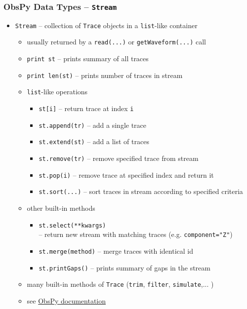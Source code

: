 \documentclass[t,10pt,compress=false,usepdftitle=false]{beamer}
\begin{document}
\begin{frame}[fragile]
    \frametitle{ObsPy Data Types -- \tt{Stream}}
    \begin{itemize}
    \item \verb#Stream# -- collection of \verb#Trace# objects in a \verb#list#-like container
        \begin{itemize}
        \item usually returned by a \verb#read(...)# or \verb#getWaveform(...)# call
        \item \verb#print st# -- prints summary of all traces
        \item \verb#print len(st)# -- prints number of traces in stream
        \item \verb#list#-like operations
            \begin{itemize}
            \item \verb#st[i]# -- return trace at index \verb#i#
            \item \verb#st.append(tr)# -- add a single trace
            \item \verb#st.extend(st)# -- add a list of traces
            \item \verb#st.remove(tr)# -- remove specified trace from stream
            \item \verb#st.pop(i)# -- remove trace at specified index and return it
            \item \verb#st.sort(...)# -- sort traces in stream according to specified criteria
            \end{itemize}
        \item other built-in methods
            \begin{itemize}
            \item \verb#st.select(**kwargs)#\\ -- return new stream with matching traces (e.g. \verb#component="Z"#)
            \item \verb#st.merge(method)# -- merge traces with identical id
            \item \verb#st.printGaps()# -- prints summary of gaps in the stream
            \end{itemize}
        \item many built-in methods of \verb#Trace# (\verb#trim#, \verb#filter#, \verb#simulate#,... )
        \item see \href{file:///home/messuser/obspy/docs/packages/auto/obspy.core.stream.Stream.html}{ObsPy documentation}
        \end{itemize}
    \end{itemize}
\end{frame}
\end{document}

